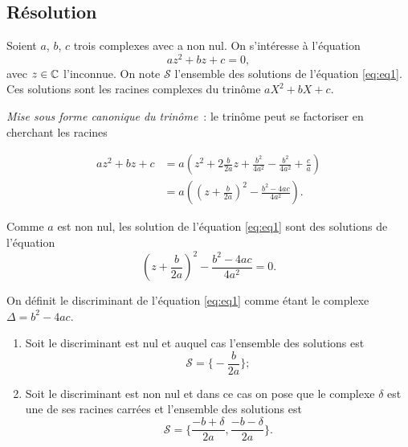 \subsection{Résolution}
\label{subsec:resolution}

Soient \(a\), \(b\), \(c\) trois complexes avec a non nul. On s'intéresse à 
l'équation
\begin{equation}
    \label{eq:eq1}
    az^2 + bz + c = 0,
\end{equation}
avec \(z \in \mathbb{C}\) l'inconnue. On note \(\mathcal{S}\) l'ensemble des solutions 
de l'équation \eqref{eq:eq1}. Ces solutions sont les racines complexes du 
trinôme \(aX^2 + bX + c\).

\emph{Mise sous forme canonique du trinôme}~: le trinôme peut se factoriser en 
cherchant les racines

\begin{align*}
    az^2 + bz + c & = a \left( z^2+ 2 \frac{b}{2a}z + \frac{b^2}{4a^2} - 
    \frac{b^2}{4a^2}  + \frac{c}{a} \right) \\
                  & = a \left( \left( z + \frac{b}{2a} \right)^2 - 
              \frac{b^2-4ac}{4a^2} \right).
\end{align*}

Comme \(a\) est non nul, les solution de l'équation \eqref{eq:eq1} sont des 
solutions de l'équation
\begin{equation}
    \left( z + \frac{b}{2a} \right)^2 - \frac{b^2-4ac}{4a^2} = 0.
\end{equation}

\begin{defdef}
    On définit le discriminant de l'équation \eqref{eq:eq1} comme étant le 
    complexe \(\Delta = b^2-4ac\).
\end{defdef}

\begin{enumerate}
    \item Soit le discriminant est nul et auquel cas l'ensemble des solutions 
        est
    \begin{equation}
        \mathcal{S} = \biggl \lbrace-\frac{b}{2a} \biggl \rbrace;
    \end{equation}
    \item Soit le discriminant est non nul et dans ce cas on pose que le 
        complexe \(\delta\) est une de ses racines carrées et l'ensemble des 
        solutions est
    \begin{equation}
        \mathcal{S} = \biggl \lbrace \frac{-b + \delta}{2a} , 
            \frac{-b-\delta}{2a} \biggl \rbrace.
    \end{equation}
\end{enumerate}

